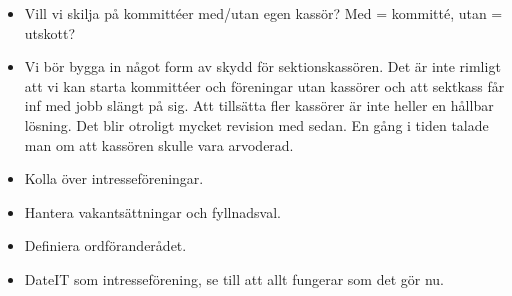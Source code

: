 \documentclass[a4paper]{dtek}
\begin{document}
\begin{itemize}
  \item Vill vi skilja på kommittéer med/utan egen kassör? Med = kommitté, utan = utskott?
  \item Vi bör bygga in något form av skydd för sektionskassören. Det är inte rimligt att vi kan starta kommittéer och föreningar utan kassörer och att sektkass får inf med jobb slängt på sig. Att tillsätta fler kassörer är inte heller en hållbar lösning. Det blir otroligt mycket revision med sedan. En gång i tiden talade man om att kassören skulle vara arvoderad.
  \item Kolla över intresseföreningar.
  \item Hantera vakantsättningar och fyllnadsval.
  \item Definiera ordföranderådet.
  \item DateIT som intresseförening, se till att allt fungerar som det gör nu.
\end{itemize}
\end{document}
